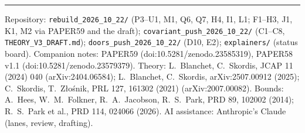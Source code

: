 \documentclass[10pt]{article}
\begin{document}
\vspace{2pt}\hrule\vspace{2pt}
{\footnotesize
Repository: \texttt{rebuild\_2026\_10\_22/} (P3--U1, M1, Q6, Q7, H4, I1, L1; F1--H3, J1, K1, M2 via PAPER59 and the draft); \texttt{covariant\_push\_2026\_10\_22/} (C1--C8, \texttt{THEORY\_V3\_DRAFT.md}); \texttt{doors\_push\_2026\_10\_22/} (D10, E2); \texttt{explainers/} (status board). Companion notes: PAPER59 (doi:10.5281/zenodo.23585319), PAPER58 v1.1 (doi:10.5281/zenodo.23579379).
Theory: L.~Blanchet, C.~Skordis, JCAP 11 (2024) 040 (arXiv:2404.06584); L.~Blanchet, C.~Skordis, arXiv:2507.00912 (2025); C.~Skordis, T.~Z{\l}o{\'s}nik, PRL 127, 161302 (2021) (arXiv:2007.00082).
Bounds: A.~Hees, W.~M.~Folkner, R.~A.~Jacobson, R.~S.~Park, PRD 89, 102002 (2014); R.~S.~Park et al., PRD 114, 024066 (2026).
AI assistance: Anthropic's Claude (lanes, review, drafting).}
\end{document}
